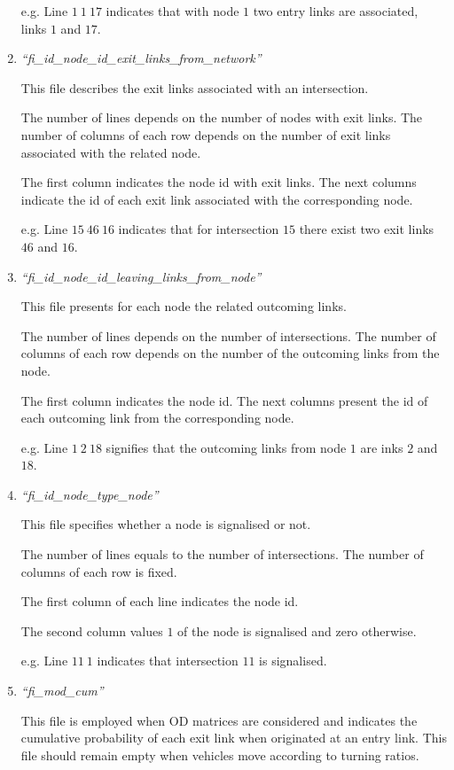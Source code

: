 \documentclass[10pt, conference, compsocconf]{IEEEtran}
\begin{document}
\begin{enumerate}
e.g. Line $1 \	1	\ 17$ indicates that with node $1$ two entry links are associated, links $1$ and $17$.


\item \emph{``fi\_id\_node\_id\_exit\_links\_from\_network''}

This file describes the exit links associated with an intersection. 

The number of lines depends on the number of nodes with exit links. The number of columns of each row depends on the number of exit links associated with the related node. 

The first column indicates the node id with exit links. The next columns indicate the id of each exit link associated with the corresponding node.

e.g. Line $15	 \ 46	\ 16$ indicates that for intersection $15$ there exist two exit links $46$ and $16$.

\item \emph{``fi\_id\_node\_id\_leaving\_links\_from\_node''}

This  file presents for each node the related outcoming links.

The number of lines depends on the number of intersections. 
The number of columns of each row depends on the number of the  outcoming links from the node. 


The first column indicates the node id. The next columns present the id of each outcoming link from the corresponding node.

e.g. Line $1  \	2	\ 18	$ signifies that the outcoming links from node $1$ are inks $2$ and $18$.

\item \emph{``fi\_id\_node\_type\_node''}
 
This file specifies whether a node is signalised  or not.

The number of lines equals to the number of intersections. 
The number of columns of each row is fixed.

The first column of each line indicates the node id. 

The second column values $1$ of the node is signalised and zero otherwise.

e.g. Line $11	\ 1$ indicates that intersection $11$ is signalised.

\item \emph{``fi\_mod\_cum''}

This file is employed when OD matrices are considered and indicates the cumulative probability  of each exit link when originated at an entry link.
This file should remain empty when vehicles move according to turning ratios.


\end{enumerate}
\end{document}
